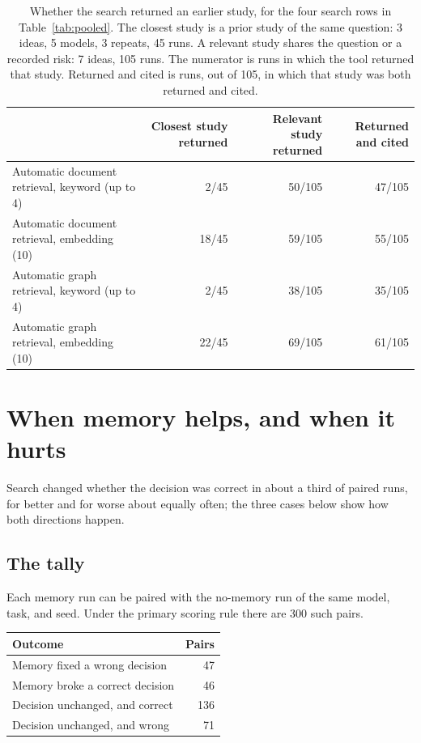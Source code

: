 \documentclass[11pt]{article}
\begin{document}
\begin{table}[H]
\centering
\caption{Whether the search returned an earlier study, for the four search rows in Table~\ref{tab:pooled}. The closest study is a prior study of the same question: 3 ideas, 5 models, 3 repeats, 45 runs. A relevant study shares the question or a recorded risk: 7 ideas, 105 runs. The numerator is runs in which the tool returned that study. Returned and cited is runs, out of 105, in which that study was both returned and cited.}
\label{tab:embed_retr}
\footnotesize
\setlength{\tabcolsep}{4pt}
\begin{tabularx}{\linewidth}{@{}>{\raggedright\arraybackslash}Xrrr@{}}
\toprule
 & Closest study returned & Relevant study returned & Returned and cited \\
\midrule
Automatic document retrieval, keyword (up to 4) & 2/45 & 50/105 & 47/105 \\
Automatic document retrieval, embedding (10) & 18/45 & 59/105 & 55/105 \\
Automatic graph retrieval, keyword (up to 4) & 2/45 & 38/105 & 35/105 \\
Automatic graph retrieval, embedding (10) & 22/45 & 69/105 & 61/105 \\
\bottomrule
\end{tabularx}
\end{table}

\section{When memory helps, and when it hurts}
\label{sec:transfer}

Search changed whether the decision was correct in about a third of paired runs, for better and for worse about equally often; the three cases below show how both directions happen.

\subsection{The tally}

Each memory run can be paired with the no-memory run of the same model, task, and seed. Under the primary scoring rule there are 300 such pairs.

\begin{center}
\begin{tabular}{lr}
\toprule
Outcome & Pairs \\
\midrule
Memory fixed a wrong decision & 47 \\
Memory broke a correct decision & 46 \\
Decision unchanged, and correct & 136 \\
Decision unchanged, and wrong & 71 \\
\bottomrule
\end{tabular}
\end{center}
\end{document}

